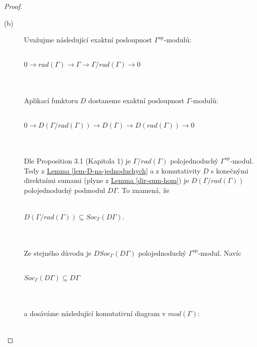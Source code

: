 \begin{proof}
\begin{description}
         \item[(b)] Uvažujme následující exaktní posloupnost 
           $\Gamma^{op}$-modulů: \\\\
           \centerline{$0
             \longrightarrow rad(\Gamma)  
             \longrightarrow \Gamma   
             \longrightarrow \Gamma/rad(\Gamma)  
             \longrightarrow 0$} \\\\
           Aplikací funktoru $D$ dostaneme exaktní posloupnost $\Gamma$-modulů:\\\\
           \centerline{$0
             \longrightarrow D(\Gamma/rad(\Gamma))  
             \longrightarrow D(\Gamma)   
             \longrightarrow D(rad(\Gamma))  
             \longrightarrow 0$} \\\\
           Dle \cite{2} Proposition 3.1 (Kapitola 1) je $\Gamma/rad(\Gamma)$ 
           polojednoduchý $\Gamma^{op}$-modul. Tedy z 
           \hyperref[lem-D-na-jednoduchych]{Lemma \ref*{lem-D-na-jednoduchych}} 
           a z komutativity $D$ s konečnými direktními sumami (plyne z 
           \hyperref[dir-sum-hom]{Lemma \ref*{dir-sum-hom}}) je  
           $D(\Gamma/rad(\Gamma))$ polojednoduchý podmodul $D\Gamma$. To 
           znamená, že \\\\
           \centerline{$D(\Gamma/rad(\Gamma))\subseteq Soc_\Gamma(D\Gamma)$.} 
           \\\\
           Ze stejného důvodu je $DSoc_\Gamma(D\Gamma)$ polojednoduchý 
           $\Gamma^{op}$-modul. Navíc \\\\
           \centerline{$Soc_\Gamma(D\Gamma)\subseteq D\Gamma$} 
           \\\\
           a dosáváme následující komutativní diagram v $mod(\Gamma)$:\\\\
           \centerline{}
\end{description}
\end{proof}
